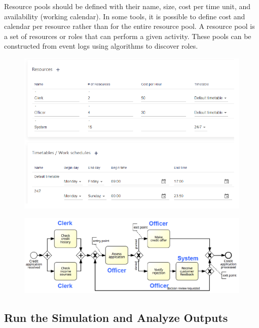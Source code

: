 Resource pools should be defined with their name, size, cost per time unit, and availability (working calendar). In some tools, it is possible to define cost and calendar per resource rather than for the entire resource pool. A resource pool is a set of resources or roles that can perform a given activity. These pools can be constructed from event logs using algorithms to discover roles.
\begin{figure}[h!]
    \centering
    \includegraphics[width=0.75\linewidth]{capitolo 10/5.png}
\end{figure}
\begin{figure}[h!]
    \centering
    \includegraphics[width=0.75\linewidth]{capitolo 10/6.png}
\end{figure}

\subsection{Run the Simulation and Analyze Outputs}

